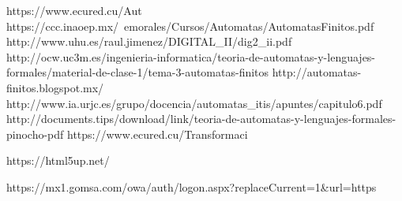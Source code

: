 https://www.ecured.cu/Aut%
https://ccc.inaoep.mx/~emorales/Cursos/Automatas/AutomatasFinitos.pdf
http://www.uhu.es/raul.jimenez/DIGITAL_II/dig2_ii.pdf
http://ocw.uc3m.es/ingenieria-informatica/teoria-de-automatas-y-lenguajes-formales/material-de-clase-1/tema-3-automatas-finitos
http://automatas-finitos.blogspot.mx/
http://www.ia.urjc.es/grupo/docencia/automatas_itis/apuntes/capitulo6.pdf
http://documents.tips/download/link/teoria-de-automatas-y-lenguajes-formales-pinocho-pdf
https://www.ecured.cu/Transformaci%


    
    

	
	

https://html5up.net/

https://mx1.gomsa.com/owa/auth/logon.aspx?replaceCurrent=1&url=https%
